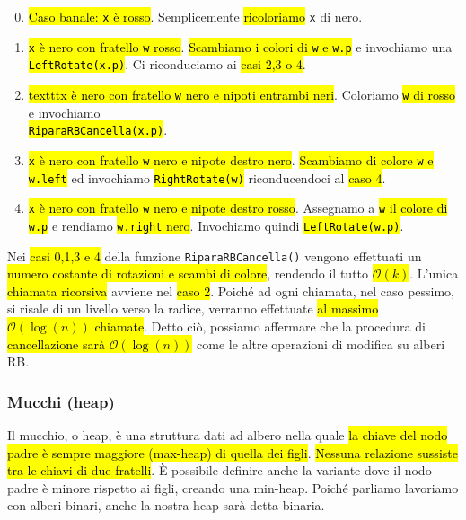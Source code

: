 \documentclass[a4paper,11pt,oneside]{article}
\theoremstyle{plain}
\theoremstyle{definition}
\theoremstyle{remark}
\begin{document}
\begin{enumerate}
  \setcounter{enumi}{-1}
  \item \hl{Caso banale: \texttt{x} è rosso}. Semplicemente \hl{ricoloriamo}
    \texttt{x} di nero.
  \item \hl{\texttt{x} è nero con fratello \texttt{w} rosso}. \hl{Scambiamo i
    colori di \texttt{w} e \texttt{w.p}} e invochiamo una
    \hl{\texttt{LeftRotate(x.p)}}. Ci riconduciamo ai \hl{casi 2,3 o 4}.
  \item \hl{texttt{x} è nero con fratello \texttt{w} nero e nipoti entrambi
    neri}. Coloriamo \hl{\texttt{w} di rosso} e invochiamo \\
    \hl{\texttt{RiparaRBCancella(x.p)}}.
  \item \hl{\texttt{x} è nero con fratello \texttt{w} nero e nipote destro
    nero}. \hl{Scambiamo di colore \texttt{w} e \texttt{w.left}} ed invochiamo
    \hl{\texttt{RightRotate(w)}} riconducendoci al \hl{caso 4}.
  \item \hl{\texttt{x} è nero con fratello \texttt{w} nero e nipote destro
    rosso}. Assegnamo a \hl{\texttt{w} il colore di \texttt{w.p}} e rendiamo
    \hl{\texttt{w.right} nero}. Invochiamo quindi \hl{\texttt{LeftRotate(w.p)}}.
\end{enumerate}

\noindent Nei \hl{casi 0,1,3 e 4} della funzione \texttt{RiparaRBCancella()}
vengono effettuati un \hl{numero costante di rotazioni e scambi di colore},
rendendo il tutto \hl{$\mathcal{O}(k)$}. L'unica \hl{chiamata ricorsiva} avviene
nel \hl{caso 2}. Poiché ad ogni chiamata, nel caso pessimo, si risale di un
livello verso la radice, verranno effettuate \hl{al massimo
$\mathcal{O}(\log(n))$ chiamate}. Detto ciò, possiamo affermare che la procedura
di \hl{cancellazione sarà $\mathcal{O}(\log(n))$} come le altre operazioni di
modifica su alberi RB.

\subsubsection{Mucchi (heap)}\label{sec:heap}

Il mucchio, o heap, è una struttura dati ad albero nella quale \hl{la chiave del
nodo padre è sempre maggiore (max-heap) di quella dei figli}. \hl{Nessuna relazione
sussiste tra le chiavi di due fratelli}. È possibile definire anche la variante
dove il nodo padre è minore rispetto ai figli, creando una min-heap. Poiché
parliamo lavoriamo con alberi binari, anche la nostra heap sarà detta binaria.
\end{document}
